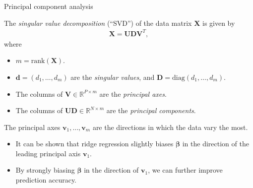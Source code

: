 \documentclass[8pt]{beamer}
\newcommand{\mys}{\vspace{0.5cm} \pause
}
\begin{document}
\begin{frame}{\color{white} Principal component analysis}

The \textit{singular value decomposition} (``SVD'') of the data matrix $\mathbf{X}$ is given by 
\begin{align}
    \label{SVD}
    \mathbf{X} = \mathbf{U} \mathbf{D} \mathbf{V}^T,
\end{align}
where 
\begin{itemize}
    \item $m = \mathrm{rank}(\mathbf{X})$.
    \item $\bm{d} = (d_1, \ldots, d_m)$ are the \textit{singular values}, and $\mathbf{D} = \mathrm{diag}(d_1, \ldots, d_m)$.
    \item The columns of $\mathbf{V} \in \mathbb{R}^{P \times m}$ are the \textit{principal axes}.
    \item The columns of $\mathbf{U} \mathbf{D} \in \mathbb{R}^{N \times m}$ are the \textit{principal components}.
\end{itemize} \mys

The principal axes $\bm{v}_1, \ldots, \bm{v}_m$ are the directions in which the data vary the most.
\begin{itemize}
    \item It can be shown that ridge regression slightly biases $\bm{\beta}$ in the direction of the leading principal axis $\bm{v}_1$.
    \item By strongly biasing $\bm{\beta}$ in the direction of $\bm{v}_1$, we can further improve prediction accuracy.
\end{itemize}
    
\end{frame}
\end{document}
